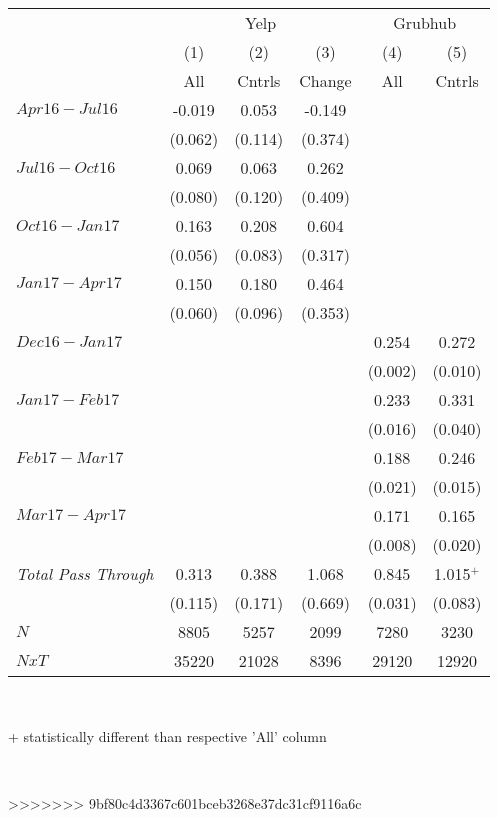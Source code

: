 \begin{center}
\begin{tabular}{lccccc}
\hline  & \multicolumn{3}{c}{Yelp} & \multicolumn{2}{c}{Grubhub}\\
 & (1) & (2) & (3) & (4) & (5)\\
 & All & Cntrls & Change & All & Cntrls\\
\hline  $ Apr16-Jul16 $  & -0.019 & 0.053 & -0.149 &  & \\
 & (0.062) & (0.114) & (0.374) &  & \\
 $ Jul16-Oct16 $  & 0.069 & 0.063 & 0.262 &  & \\
 & (0.080) & (0.120) & (0.409) &  & \\
 $ Oct16-Jan17 $  & 0.163 & 0.208 & 0.604 &  & \\
 & (0.056) & (0.083) & (0.317) &  & \\
 $ Jan17-Apr17 $  & 0.150 & 0.180 & 0.464 &  & \\
 & (0.060) & (0.096) & (0.353) &  & \\
\hline  $ Dec16-Jan17 $  &  &  &  & 0.254 & 0.272\\
 &  &  &  & (0.002) & (0.010)\\
 $ Jan17-Feb17 $  &  &  &  & 0.233 & 0.331\\
 &  &  &  & (0.016) & (0.040)\\
 $ Feb17-Mar17 $  &  &  &  & 0.188 & 0.246\\
 &  &  &  & (0.021) & (0.015)\\
 $ Mar17-Apr17 $  &  &  &  & 0.171 & 0.165\\
 &  &  &  & (0.008) & (0.020)\\
\hline \textit{Total Pass Through} & 0.313 & 0.388 & 1.068 & 0.845 & 1.015$^+$\\
  & (0.115) & (0.171) & (0.669) & (0.031) & (0.083)\\
\hline  $ N $  & 8805 & 5257 & 2099 & 7280 & 3230\\
 $ NxT $  & 35220 & 21028 & 8396 & 29120 & 12920\\
\hline\end{tabular}\\
\begin{tiny}+ statistically different than respective 'All' column \end{tiny}\\
\end{center}
>>>>>>> 9bf80c4d3367c601bceb3268e37dc31cf9116a6c
